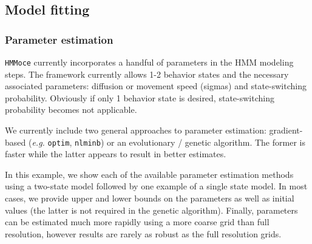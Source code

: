 \documentclass{article}\usepackage[]{graphicx}\usepackage[]{color}
\newcommand{\eg}{\textit{e.g.} }
\begin{document}
\subsection{Model fitting}

\subsubsection{Parameter estimation}
\texttt{HMMoce} currently incorporates a handful of parameters in the HMM modeling steps. The framework currently allows 1-2 behavior states and the necessary associated parameters: diffusion or movement speed (sigmas) and state-switching probability. Obviously if only 1 behavior state is desired, state-switching probability becomes not applicable.

We currently include two general approaches to parameter estimation: gradient-based (\eg \texttt{optim}, \texttt{nlminb}) or an evolutionary / genetic algorithm. The former is faster while the latter appears to result in better estimates.

In this example, we show each of the available parameter estimation methods using a two-state model followed by one example of a single state model. In most cases, we provide upper and lower bounds on the parameters as well as initial values (the latter is not required in the genetic algorithm). Finally, parameters can be estimated much more rapidly using a more coarse grid than full resolution, however results are rarely as robust as the full resolution grids.
\end{document}
